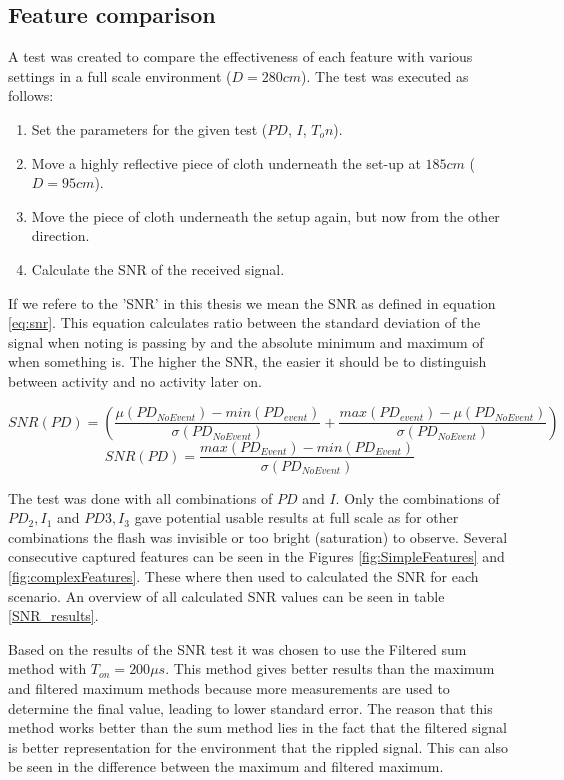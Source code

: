 \subsection{Feature comparison}
A test was created to compare the effectiveness of each feature with various settings in a full scale environment ($D = 280cm$). The test was executed as follows:
\begin{enumerate}[itemsep=-1ex]
	\item Set the parameters for the given test ($PD$, $I$, $T_on$).
	\item Move a highly reflective piece of cloth underneath the set-up at $185cm$ ($D = 95cm$).
	\item Move the piece of cloth underneath the setup again, but now from the other direction.
	\item Calculate the SNR of the received signal.
\end{enumerate}
If we refere to the 'SNR' in this thesis we mean the SNR as defined in equation \ref{eq:snr}. This equation calculates ratio between the standard deviation of the signal when noting is passing by and the absolute minimum and maximum of when something is. The higher the SNR, the easier it should be to distinguish between activity and no activity later on.

\begin{equation}
SNR(PD) = \left(\frac{\mu(PD_{NoEvent}) - min(PD_{event})}{\sigma(PD_{NoEvent})} + \frac{ max(PD_{event}) - \mu(PD_{NoEvent})}{\sigma(PD_{NoEvent})}\right)
\end{equation}
\begin{equation}
\label{eq:snr}
SNR(PD) = \frac{max(PD_{Event}) - min(PD_{Event})}{\sigma(PD_{NoEvent})} 
\end{equation}

The test was done with all combinations of $PD$ and $I$. Only the combinations of $PD_2, I_{1}$ and $PD3, I_{3}$ gave potential usable results at full scale as for other combinations the flash was invisible or too bright (saturation) to observe. Several consecutive captured features can be seen in the Figures \ref{fig:SimpleFeatures} and \ref{fig:complexFeatures}. These where then used to calculated the SNR for each scenario. An overview of all calculated SNR values can be seen in table \ref{SNR_results}.

Based on the results of the SNR test it was chosen to use the Filtered sum method with $T_{on} = 200\mu s$. This method gives better results than the maximum and filtered maximum methods because more measurements are used to determine the final value, leading to lower standard error. The reason that this method works better than the sum method lies in the fact that the filtered signal is better representation for the environment that the rippled signal. This can also be seen in the difference between the maximum and filtered maximum.

